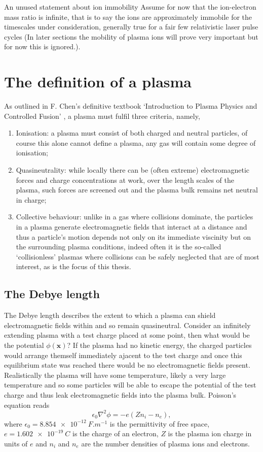 An unused statement about ion immobility
Assume for now that the ion-electron mass ratio is infinite, that is to say the ions are approximately immobile for the timescales under consideration, generally true for a fair few relativistic laser pulse cycles (In later sections the mobility of plasma ions will prove very important but for now this is ignored.).

\section{\label{sec:plasma_def}The definition of a plasma}
As outlined in F. Chen's definitive textbook `Introduction to Plasma Physics and Controlled Fusion' \cite{chen20116}, a plasma must fulfil three criteria, namely,

\begin{enumerate}
	\item Ionisation: a plasma must consist of both charged and neutral particles, of course this alone cannot define a plasma, any gas will contain some degree of ionisation;
	\item Quasineutrality: while locally there can be (often extreme) electromagnetic forces and charge concentrations at work, over the length scales of the plasma, such forces are screened out and the plasma bulk remains net neutral in charge;
	\item Collective behaviour: unlike in a gas where collisions dominate, the particles in a plasma generate electromagnetic fields that interact at a distance and thus a particle's motion depends not only on its immediate viscinity but on the surrounding plasma conditions, indeed often it is the so-called `collisionless' plasmas where collisions can be safely neglected that are of most interest, as is the focus of this thesis.
\end{enumerate}

\subsection{\label{sec:debye_length}The Debye length}
The Debye length describes the extent to which a plasma can shield electromagnetic fields within and so remain quasineutral. Consider an infinitely extending plasma with a test charge placed at some point, then what would be the potential $\phi(\mathbf{x})$? If the plasma had no kinetic energy, the charged particles would arrange themself immediately ajacent to the test charge and once this equilibrium state was reached there would be no electromagnetic fields present. Realistically the plasma will have some temperature, likely a very large temperature and so some particles will be able to escape the potential of the test charge and thus leak electromagnetic fields into the plasma bulk. Poisson's equation reads
\begin{equation}\label{eq:poisson}
	\epsilon_0\nabla^2\phi = -e(Zn_i - n_e),
\end{equation}
where $\epsilon_0 = \qty{8.854e-12}{F.m^{-1}}$ is the permittivity of free space, $e = \qty{1.602e-19}{C}$ is the charge of an electron, $Z$ is the plasma ion charge in units of $e$ and $n_i$ and $n_e$ are the number densities of plasma ions and electrons.


